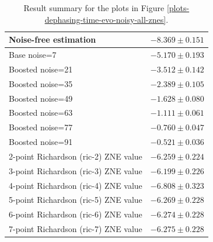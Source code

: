 \begin{table}
\caption{Result summary for the plots in Figure \ref{plots-dephasing-time-evo-noisy-all-znes}.}
\begin{tabular*}{\textwidth}{@{\extracolsep{\fill}}ll@{}}
\toprule

Noise-free estimation & $-8.369 \pm 0.151$ \\
\midrule
Base noise=7 & $-5.170 \pm 0.193$ \\
Boosted noise=21 & $-3.512 \pm 0.142$ \\
Boosted noise=35 & $-2.389 \pm 0.105$ \\
Boosted noise=49 & $-1.628 \pm 0.080$ \\
Boosted noise=63 & $-1.111 \pm 0.061$ \\
Boosted noise=77 & $-0.760 \pm 0.047$ \\
Boosted noise=91 & $-0.521 \pm 0.036$ \\
\midrule
2-point Richardson (ric-2) ZNE value & $-6.259 \pm 0.224$ \\
3-point Richardson (ric-3) ZNE value & $-6.199 \pm 0.226$ \\
4-point Richardson (ric-4) ZNE value & $-6.808 \pm 0.323$ \\
5-point Richardson (ric-5) ZNE value & $-6.269 \pm 0.228$ \\
6-point Richardson (ric-6) ZNE value & $-6.274 \pm 0.228$ \\
7-point Richardson (ric-7) ZNE value & $-6.275 \pm 0.228$ \\
\bottomrule
\end{tabular*}
\label{table-dephasing-noise-free-time-evo}
\end{table}
